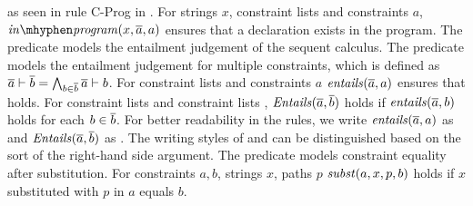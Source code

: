as seen in rule C-Prog in .
For strings $x$, constraint lists  and constraints $a$,
$\inprog(x, \ovl{a}, a)$ ensures that a declaration 
exists in the program.
The predicate  models the entailment judgement of the sequent calculus.
The predicate  models the entailment judgement for multiple constraints,
which is defined as $\overline{a} \vdash \overline{b} = \bigwedge_{b \in \overline{b}}{\overline{a} \vdash b}$.
For constraint lists  and constraints $a$
$\mathit{entails}(\overline{a}, a)$ ensures that  holds.
For constraint lists  and constraint lists ,
$\mathit{Entails}(\overline{a}, \overline{b})$ holds if
$\mathit{entails}(\overline{a}, b)$ holds for each $b \in \overline{b}$.
For better readability in the rules, we write
$\mathit{entails}(\overline{a}, a)$ as  and
$\mathit{Entails}(\overline{a}, \overline{b})$ as .
The writing styles of  and  can be distinguished
based on the sort of the right-hand side argument.
The predicate  models constraint equality after substitution.
For constraints $a, b$, strings $x$, paths $p$
$\mathit{subst}(a, x, p, b)$ holds if
$x$ substituted with $p$ in $a$ equals $b$.
